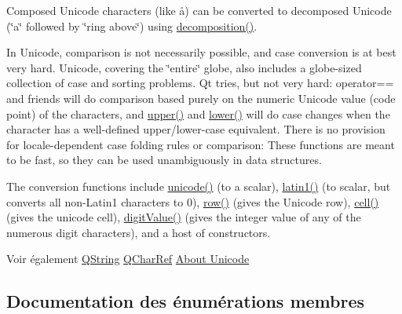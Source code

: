 Composed Unicode characters (like \aa) can be converted to decomposed Unicode (\char`\"{}a\char`\"{} followed by \char`\"{}ring above\char`\"{}) using \hyperlink{class_q_char_a275c2ad60e7096c7528c21569a033c2b}{decomposition()}.

In Unicode, comparison is not necessarily possible, and case conversion is at best very hard. Unicode, covering the \char`\"{}entire\char`\"{} globe, also includes a globe-\/sized collection of case and sorting problems. Qt tries, but not very hard\+: operator== and friends will do comparison based purely on the numeric Unicode value (code point) of the characters, and \hyperlink{class_q_char_a5f66ffe2c1fd7386541dfd88a6513213}{upper()} and \hyperlink{class_q_char_abb5fb3d117299a8eb93fc0ed3173f6fa}{lower()} will do case changes when the character has a well-\/defined upper/lower-\/case equivalent. There is no provision for locale-\/dependent case folding rules or comparison\+: These functions are meant to be fast, so they can be used unambiguously in data structures.

The conversion functions include \hyperlink{class_q_char_afccd5f47b4b43fc6d96272f2f4b0db28}{unicode()} (to a scalar), \hyperlink{class_q_char_a7e3aa161f0abd6fae0ecdbe18695b597}{latin1()} (to scalar, but converts all non-\/\+Latin1 characters to 0), \hyperlink{class_q_char_a8f987c65692f95eebc84bf687ea92aff}{row()} (gives the Unicode row), \hyperlink{class_q_char_a2475b4653bed4cf2a3f10395a14cc9c5}{cell()} (gives the unicode cell), \hyperlink{class_q_char_a87541b491545da7285be57716eeab6cd}{digit\+Value()} (gives the integer value of any of the numerous digit characters), and a host of constructors.

\begin{DoxySeeAlso}{Voir également}
\hyperlink{class_q_string}{Q\+String} \hyperlink{class_q_char_ref}{Q\+Char\+Ref} \hyperlink{class_q_char_afccd5f47b4b43fc6d96272f2f4b0db28}{About Unicode } 
\end{DoxySeeAlso}


\subsection{Documentation des énumérations membres}
\hypertarget{class_q_char_a62908095db0c54f35ff2ae928c621a97}{}
